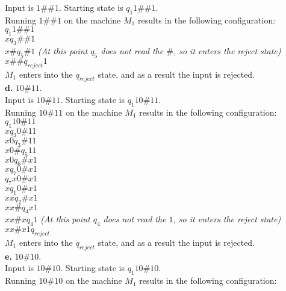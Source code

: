 \documentclass[12pt]{article}
\begin{document}
Input is $1\#\#1$. Starting state is $q_1 1\#\#1$. \\
Running $1\#\#1$ on the machine $M_1$ results in the following configuration: \\

$q_1 1 \# \# 1$ \\
$x q_3 \# \# 1$ \\
$x \# q_5 \# 1$ \textit{(At this point $q_5$ does not read the $\#$, so it enters the reject state)} \\
$x \# \# q_{reject} 1 $ \\
$M_1$ enters into the $q_{reject}$ state, and as a result the input is rejected. \\

\pagebreak
\textbf{d.} $10\#11$. \\

Input is $10\#11$. Starting state is $q_1 10\#11$. \\
Running $10\#11$ on the machine $M_1$ results in the following configuration: \\

$        q_1 10 \# 11  $ \\
$x       q_3 0 \# 11   $ \\
$x0      q_3 \# 11     $ \\
$x0 \#   q_5 11        $ \\
$x0      q_6 \# x 1    $ \\
$x       q_7 0 \# x 1    $ \\
$        q_7 x 0 \# x 1  $ \\
$x       q_1 0 \# x 1    $ \\
$xx      q_2 \# x 1      $ \\
$xx \#   q_4 x 1         $ \\
$xx \# x q_4 1 $ \textit{(At this point $q_4$ does not read the $1$, so it enters the reject state)} \\
$xx \# x 1 q_{reject}    $ \\
$M_1$ enters into the $q_{reject}$ state, and as a result the input is rejected. \\

\pagebreak
\textbf{e.} $10\#10$. \\

Input is $10\#10$. Starting state is $q_1 10\#10$. \\
Running $10\#10$ on the machine $M_1$ results in the following configuration: \\
\end{document}
